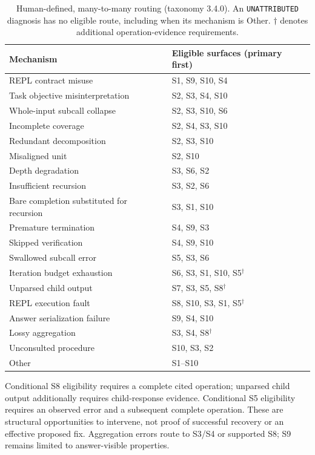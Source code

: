 \begin{table}[t]
\centering\small
\begin{tabularx}{\linewidth}{@{}Xl@{}}
\toprule
Mechanism & Eligible surfaces (primary first) \\
\midrule
REPL contract misuse & S1, S9, S10, S4 \\
Task objective misinterpretation & S2, S3, S4, S10 \\
Whole-input subcall collapse & S2, S3, S10, S6 \\
Incomplete coverage & S2, S4, S3, S10 \\
Redundant decomposition & S2, S3, S10 \\
Misaligned unit & S2, S10 \\
Depth degradation & S3, S6, S2 \\
Insufficient recursion & S3, S2, S6 \\
Bare completion substituted for recursion & S3, S1, S10 \\
Premature termination & S4, S9, S3 \\
Skipped verification & S4, S9, S10 \\
Swallowed subcall error & S5, S3, S6 \\
Iteration budget exhaustion & S6, S3, S1, S10, S5$^{\dagger}$ \\
Unparsed child output & S7, S3, S5, S8$^{\dagger}$ \\
REPL execution fault & S8, S10, S3, S1, S5$^{\dagger}$ \\
Answer serialization failure & S9, S4, S10 \\
Lossy aggregation & S3, S4, S8$^{\dagger}$ \\
Unconsulted procedure & S10, S3, S2 \\
Other & S1--S10 \\
\bottomrule
\end{tabularx}
\caption{Human-defined, many-to-many routing (taxonomy 3.4.0).
An \texttt{UNATTRIBUTED} diagnosis has no eligible route, including when its
mechanism is Other. $\dagger$ denotes additional operation-evidence requirements.}
\label{tab:routes}
\end{table}

Conditional S8 eligibility requires a complete cited operation; unparsed child
output additionally requires child-response evidence. Conditional S5 eligibility
requires an observed error and a subsequent complete operation. These are
structural opportunities to intervene, not proof of successful recovery or an
effective proposed fix. Aggregation errors route to S3/S4 or supported S8;
S9 remains limited to answer-visible properties.

